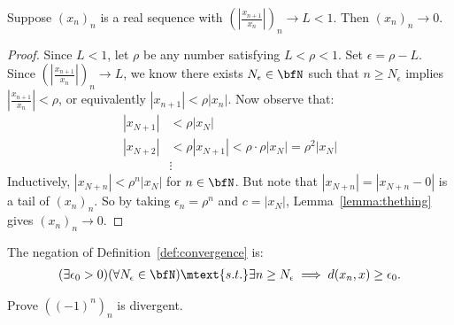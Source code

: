     \begin{proposition}
        Suppose $(x_n)_n$ is a real sequence with $\left(\left|\frac{x_{n+1}}{x_n}\right|\right)_n \rightarrow L < 1$. Then $(x_n)_n \rightarrow 0$.
    \end{proposition}
        \begin{proof}
            Since $L<1$, let $\rho$ be any number satisfying $L < \rho < 1$. Set $\epsilon = \rho - L$. Since $\left(\left|\frac{x_{n+1}}{x_n}\right|\right)_n \rightarrow L$, we know there exists $N_\epsilon \in \bfN$ such that $n \geq N_\epsilon$ implies $\left|\frac{x_{n+1}}{x_n}\right| < \rho$, or equivalently $|x_{n+1}| < \rho|x_n|$. Now observe that:
                \begin{equation*}
                \begin{split}
                    |x_{N+1}| &< \rho|x_N| \\
                    |x_{N+2}| &< \rho|x_{N+1}| < \rho \cdot \rho |x_N| = \rho^2 |x_N|\\
                    &\vdots
                \end{split}
                \end{equation*}
            Inductively, $|x_{N+n}| < \rho^n|x_N|$ for $n \in \bfN$. But note that $|x_{N+n}| = |x_{N+n} - 0|$ is a tail of $(x_n)_n$. So by taking $\epsilon_n = \rho^n$ and $c = |x_N|$, Lemma~\ref{lemma:thething} gives $(x_n)_n \rightarrow 0$.
        \end{proof}

    \begin{note}
        The negation of Definition~\ref{def:convergence} is:
            \begin{equation*}
            \begin{split}
                (\exists \epsilon_0 > 0)(\forall N_\epsilon \in \bfN) \mtext{s.t.} \exists n \geq N_\epsilon \implies d(x_n,x) \geq \epsilon_0.
            \end{split}
            \end{equation*}
    \end{note}

    \begin{example}
        Prove $((-1)^n)_n$ is divergent.
    \end{example}
        \begin{solution}
            
        \end{solution}
